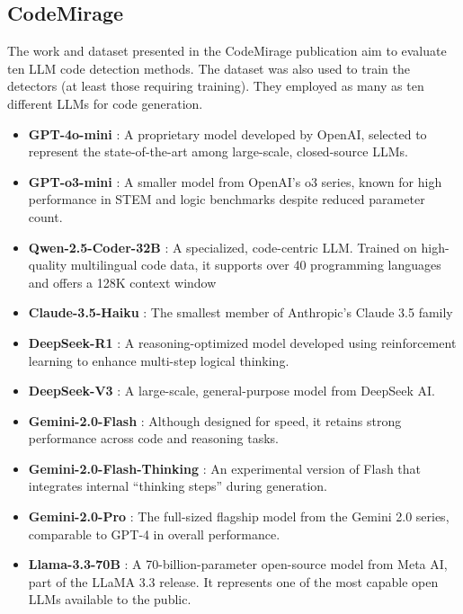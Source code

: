 \subsection{CodeMirage}
The work and dataset presented in the CodeMirage 
publication aim to evaluate ten LLM code detection 
methods. The dataset was also used to train the detectors 
(at least those requiring training).
They employed as many as ten different LLMs for 
code generation.

\begin{itemize}
    \item \textbf{GPT-4o-mini} \cite{openai_gpt4o_2024} : A proprietary model developed by OpenAI, selected to represent the state-of-the-art among large-scale, closed-source LLMs.
    \item \textbf{GPT-o3-mini} \cite{o3mini-openai-2025} : A smaller model from OpenAI's o3 series, known for high performance in STEM and logic benchmarks despite reduced parameter count.
    \item \textbf{Qwen-2.5-Coder-32B} \cite{hui2024qwen2} :  A specialized, code-centric LLM. Trained on high-quality multilingual code data, it supports over 40 programming languages and offers a 128K context window
    \item \textbf{Claude-3.5-Haiku} \cite{anthropic2024model} : The smallest member of Anthropic’s Claude 3.5 family
    \item \textbf{DeepSeek-R1} \cite{guo2025deepseek} : A reasoning-optimized model developed using reinforcement learning to enhance multi-step logical thinking.
    \item \textbf{DeepSeek-V3} \cite{liu2024deepseek} : A large-scale, general-purpose model from DeepSeek AI.
    \item \textbf{Gemini-2.0-Flash} \cite{google-gemini2-flash-2025} : Although designed for speed, it retains strong performance across code and reasoning tasks.
    \item \textbf{Gemini-2.0-Flash-Thinking} \cite{google-gemini2-flash-2025} : An experimental version of Flash that integrates internal “thinking steps” during generation. 
    \item \textbf{Gemini-2.0-Pro} \cite{google-gemini2-flash-2025} : The full-sized flagship model from the Gemini 2.0 series, comparable to GPT‑4 in overall performance.
    \item \textbf{Llama-3.3-70B} \cite{grattafiori2024llama} : A 70-billion-parameter open-source model from Meta AI, part of the LLaMA 3.3 release. It represents one of the most capable open LLMs available to the public.

\end{itemize}







